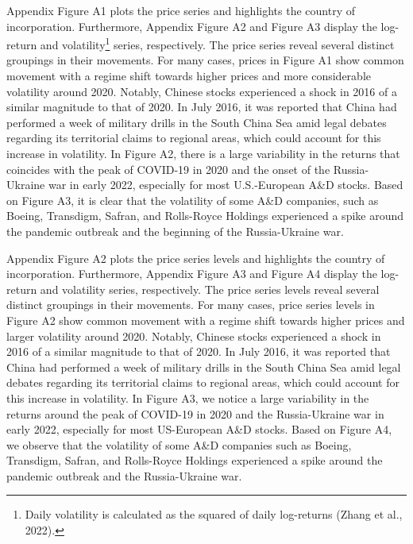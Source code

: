 \documentclass[
  letterpaper,
  DIV=11,
  numbers=noendperiod]{scrartcl}
\begin{document}
Appendix Figure A1 plots the price series and highlights the country of
incorporation. Furthermore, Appendix Figure A2 and Figure A3 display the
log-return and volatility\footnote{Daily volatility is calculated as the
  squared of daily log-returns (Zhang et al., 2022).} series,
respectively. The price series reveal several distinct groupings in
their movements. For many cases, prices in Figure A1 show common
movement with a regime shift towards higher prices and more considerable
volatility around 2020. Notably, Chinese stocks experienced a shock in
2016 of a similar magnitude to that of 2020. In July 2016, it was
reported that China had performed a week of military drills in the South
China Sea amid legal debates regarding its territorial claims to
regional areas, which could account for this increase in volatility. In
Figure A2, there is a large variability in the returns that coincides
with the peak of COVID-19 in 2020 and the onset of the Russia-Ukraine
war in early 2022, especially for most U.S.-European A\&D stocks. Based
on Figure A3, it is clear that the volatility of some A\&D companies,
such as Boeing, Transdigm, Safran, and Rolls-Royce Holdings experienced
a spike around the pandemic outbreak and the beginning of the
Russia-Ukraine war.

Appendix Figure A2 plots the price series levels and highlights the
country of incorporation. Furthermore, Appendix Figure A3 and Figure A4
display the log-return and volatility series, respectively. The price
series levels reveal several distinct groupings in their movements. For
many cases, price series levels in Figure A2 show common movement with a
regime shift towards higher prices and larger volatility around 2020.
Notably, Chinese stocks experienced a shock in 2016 of a similar
magnitude to that of 2020. In July 2016, it was reported that China had
performed a week of military drills in the South China Sea amid legal
debates regarding its territorial claims to regional areas, which could
account for this increase in volatility. In Figure A3, we notice a large
variability in the returns around the peak of COVID-19 in 2020 and the
Russia-Ukraine war in early 2022, especially for most US-European A\&D
stocks. Based on Figure A4, we observe that the volatility of some A\&D
companies such as Boeing, Transdigm, Safran, and Rolls-Royce Holdings
experienced a spike around the pandemic outbreak and the Russia-Ukraine
war.
\end{document}
